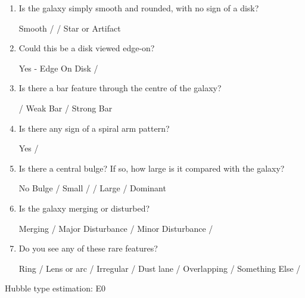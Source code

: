 \documentclass[11pt,letterpaper]{article}
\begin{document}
\begin{enumerate}
\item Is the galaxy simply smooth and rounded, with no sign of a disk?

        Smooth /  / Star or Artifact

    \item Could this be a disk viewed edge-on?

Yes - Edge On Disk / 

\item Is there a bar feature through the centre of the galaxy?

     / Weak Bar / Strong Bar

\item Is there any sign of a spiral arm pattern?

    Yes / 

\item Is there a central bulge? If so, how large is it compared with the galaxy?

    No Bulge / Small /  / Large / Dominant

\item Is the galaxy merging or disturbed?

Merging / Major Disturbance / Minor Disturbance / 

\item Do you see any of these rare features?

    Ring / Lens or arc / Irregular / Dust lane / Overlapping / Something Else /  

\end{enumerate}

Hubble type estimation: E0 

\newpage
\end{document}
